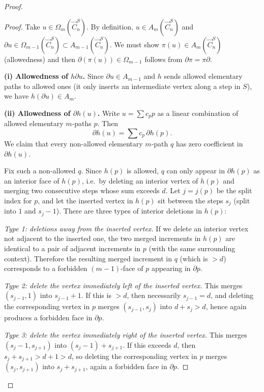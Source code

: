 \documentclass[10pt,a4paper]{amsart}
\begin{document}
\begin{proof}
\begin{proof}
Take $u\in\Omega_m(\vec{C}_n^S)$.  By definition, $u\in A_m(\vec{C}_n^S)$ and $\partial u\in \Omega_{m-1}(\vec{C}_n^S)\subset A_{m-1}(\vec{C}_n^S)$.
We must show $\pi(u)\in A_m(\vec{C}_n^S)$ (allowedness) and then $\partial(\pi(u))\in \Omega_{m-1}$ follows from
$\partial\pi=\pi\partial$.

\medskip\noindent
\textbf{(i) Allowedness of $h\partial u$.}
Since $\partial u\in A_{m-1}$ and $h$ sends allowed elementary paths to allowed ones (it only inserts an intermediate
vertex along a step in $S$), we have $h(\partial u)\in A_m$.

\medskip\noindent
\textbf{(ii) Allowedness of $\partial h(u)$.}
Write $u=\sum c_p p$ as a linear combination of allowed elementary $m$-paths $p$.  Then
\[
\partial h(u)=\sum c_p\,\partial h(p).
\]
We claim that every non-allowed elementary $m$-path $q$ has zero coefficient in $\partial h(u)$.

Fix such a non-allowed $q$.  Since $h(p)$ is allowed, $q$ can only appear in $\partial h(p)$ as an interior face of $h(p)$, i.e.\ by deleting an interior vertex of $h(p)$ and merging two consecutive steps whose sum exceeds $d$.
Let $j=j(p)$ be the split index for $p$, and let the inserted vertex in $h(p)$ sit between the steps
$s_{j}$ (split into $1$ and $s_j-1$).
There are three types of interior deletions in $h(p)$:

\smallskip
\emph{Type 1: deletions away from the inserted vertex.}
If we delete an interior vertex not adjacent to the inserted one, the two merged increments in $h(p)$
are identical to a pair of adjacent increments in $p$ (with the same surrounding context).
Therefore the resulting merged increment in $q$ (which is $>d$) corresponds to a forbidden $(m-1)$-face of $p$
appearing in $\partial p$.

\smallskip
\emph{Type 2: delete the vertex immediately left of the inserted vertex.}
This merges $(s_{j-1},1)$ into $s_{j-1}+1$.  If this is $>d$, then necessarily $s_{j-1}=d$, and deleting the
corresponding vertex in $p$ merges $(s_{j-1},s_j)$ into $d+s_j>d$, hence again produces a forbidden face in $\partial p$.

\smallskip
\emph{Type 3: delete the vertex immediately right of the inserted vertex.}
This merges $(s_j-1,s_{j+1})$ into $(s_j-1)+s_{j+1}$.  If this exceeds $d$, then $s_j+s_{j+1}>d+1>d$, so deleting
the corresponding vertex in $p$ merges $(s_j,s_{j+1})$ into $s_j+s_{j+1}$, again a forbidden face in $\partial p$.


\end{proof}
\end{proof}
\end{document}
